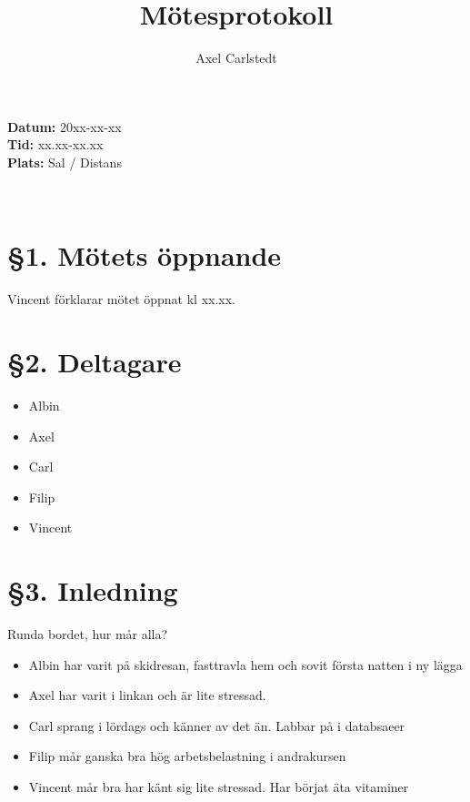 \documentclass[a4paper, 11pt]{article}
\title{Mötesprotokoll}
\author{Axel Carlstedt}
\begin{document}
\pagestyle{style1}


\textbf{Datum:} 20xx-xx-xx\\
\textbf{Tid:} xx.xx-xx.xx\\
\textbf{Plats:} Sal / Distans

\makebox[\linewidth]{\rule{\linewidth}{0.4pt}}\\

\section*{§1. Mötets öppnande}
Vincent förklarar mötet öppnat kl xx.xx.

\section*{§2. Deltagare}
\begin{itemize}
    \item Albin
    \item Axel
    \item Carl
    \item Filip
    \item Vincent
\end{itemize}


\section*{§3. Inledning}
Runda bordet, hur mår alla?
\begin{itemize}
    \item Albin har varit på skidresan, fasttravla hem och sovit första natten i ny lägga
    \item Axel har varit i linkan och är lite stressad.
    \item Carl sprang i lördags och känner av det än. Labbar på i databsaeer
    \item Filip mår ganska bra hög arbetsbelastning i andrakursen 
    \item Vincent mår bra har känt sig lite stressad. Har börjat äta vitaminer 
\end{itemize}
\end{document}

